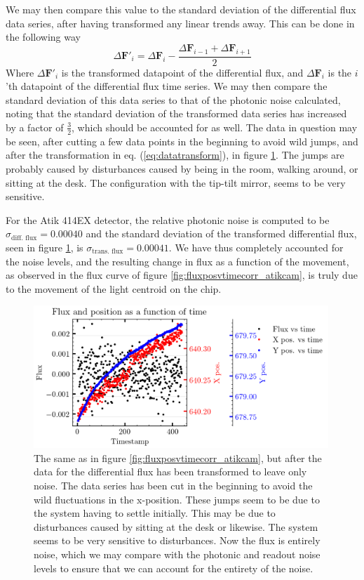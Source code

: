 \documentclass[../main.tex]{subfiles}
\begin{document}
We may then compare this value to the standard deviation of the differential flux data series, after having transformed any linear trends away. This can be done in the following way
\begin{equation}\label{eq:datatransform}
	\Delta \bm F'_i = \Delta \bm F_i - \frac{\Delta \bm F_{i-1} + \Delta \bm F_{i+1}}{2}
\end{equation}
Where $\Delta \bm F'_i$ is the transformed datapoint of the differential flux, and $\Delta \bm F_i$ is the $i$'th datapoint of the differential flux time series. We may then compare the standard deviation of this data series to that of the photonic noise calculated, noting that the standard deviation of the transformed data series has increased by a factor of $\frac32$, which should be accounted for as well. The data in question may be seen, after cutting a few data points in the beginning to avoid wild jumps, and after the transformation in eq. (\ref{eq:datatransform}), in figure \ref{fig:fluxposvtimecorr_atikcam_transform}. The jumps are probably caused by disturbances caused by being in the room, walking around, or sitting at the desk. The configuration with the tip-tilt mirror, seems to be very sensitive.

For the Atik 414EX detector, the relative photonic noise is computed to be $ \sigma_\text{diff. flux} = 0.00040 $ and the standard deviation of the transformed differential flux, seen in figure \ref{fig:fluxposvtimecorr_atikcam_transform}, is $\sigma_\text{trans. flux} = 0.00041  $. We have thus completely accounted for the noise levels, and the resulting change in flux as a function of the movement, as observed in the flux curve of figure \ref{fig:fluxposvtimecorr_atikcam}, is truly due to the movement of the light centroid on the chip. 

\begin{figure}[h!]
	\centering
	\includegraphics[width = 0.99\textwidth]{fluxposvtimecorr_atikcam.png}
	\caption{The same as in figure \ref{fig:fluxposvtimecorr_atikcam}, but after the data for the differential flux has been transformed to leave only noise. The data series has been cut in the beginning to avoid the wild fluctuations in the x-position. These jumps seem to be due to the system having to settle initially. This may be due to disturbances caused by sitting at the desk or likewise. The system seems to be very sensitive to disturbances. Now the flux is entirely noise, which we may compare with the photonic and readout noise levels to ensure that we can account for the entirety of the noise. }
	\label{fig:fluxposvtimecorr_atikcam_transform}
\end{figure}
\end{document}
